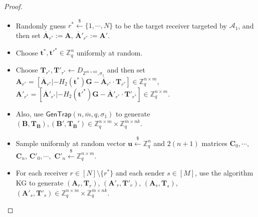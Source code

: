 \documentclass[a4paper,11pt,onecolumn]{elsarticle}
\begin{document}
\begin{proof}
\begin{description}
\begin{itemize}
						  	\item Randomly guess $r^* \xleftarrow{\$} \{1, \cdots, N\}$ to be the target receiver targeted by $\mathcal{A}_1$, and then set $\overline{\mathbf{A}}_{r^*}:=\textbf{A}$, $\overline{\mathbf{A}}'_{r^*}:=\textbf{A}'$. 
						  	\item Choose $\textbf{t}^*, \textbf{t}'^*\in \mathbb{Z}_q^n$ uniformly at random.
						  	\item  Choose $ \mathbf{T}_{r^*}, \mathbf{T}'_{r^*} \leftarrow D_{\mathbb{Z}^{\overline{m} \times n k }, \sigma_1} $ and then set $\mathbf{A}_{r^*}=[\overline{\mathbf{A}}_{r^*}|-H_2(\textbf{t}^*)\mathbf{G}-\overline{\mathbf{A}}_{r^*}\cdot \mathbf{T}_{r^*}] \in \mathbb{Z}_q^{n \times m}$, $\mathbf{A}'_{r^*}=[\overline{\mathbf{A}}'_{r^*}|-H_2(\textbf{t}'^*)\mathbf{G}-\overline{\mathbf{A}}'_{r^*}\cdot \mathbf{T}'_{r^*}] \in \mathbb{Z}_q^{n \times m}$.
						  	\item Also, use $\textsf{GenTrap}(n, \overline{m},q, \sigma_1)$ to generate  $(\mathbf{B}, \mathbf{T}_{\textbf{B}}), (\mathbf{B}', \mathbf{T}_{\textbf{B}}') \in  \mathbb{Z}_q^{n \times m} \times \mathbb{Z}_q^{\overline{m} \times nk}$.
						  	\item Sample uniformly at random vector $ \mathbf{u} \xleftarrow{\$} \mathbb{Z}_q ^{n}$ and  $2(n+1)$ matrices $\mathbf{C}_0, \cdots,$ $ \mathbf{C}_{n}$, $\mathbf{C}'_0, \cdots,$ $ \mathbf{C}'_{n} \xleftarrow{\$} \mathbb{Z}_q^{n \times m}$.
						  	\item For each receiver $r \in [N]\setminus \{r^*\}$ and each sender $s\in [M]$, use the algorithm \textsf{KG} to generate  $(\mathbf{A}_r, \mathbf{T}_r)$, $ (\mathbf{A}'_r, \mathbf{T}'_r)$, $(\mathbf{A}_s, \mathbf{T}_s)$, $(\mathbf{A}'_s, \mathbf{T}'_s) \in  \mathbb{Z}_q^{n \times m} \times \mathbb{Z}_q^{\overline{m} \times n k}$.
						  	

\end{itemize}
\end{description}
\end{proof}
\end{document}
